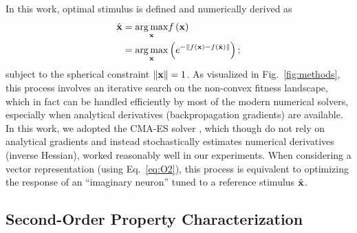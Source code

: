 \documentclass[10pt,twocolumn,letterpaper]{article}
\begin{document}
In this work, optimal stimulus is defined and numerically derived as 
\begin{align}
\hat{\bf{x}} &= \underset{\bf{x}} {\arg\max} f\left(\bf{x}\right) \label{eq:O1} \\
&= \underset{\bf{x}}{\arg\max} \left( e^{-\left\|f\left(\bf{x}\right)-f\left(\tilde{\bf{x}}\right)\right\|} \right); \label{eq:O2}
\end{align}
subject to the spherical constraint $\left\| \bf{x} \right\| = 1$. 
As visualized in Fig.~\ref{fig:methods}, this process involves an iterative search on the non-convex fitness landscape, which in fact can be handled efficiently by most of the modern numerical solvers, especially when analytical derivatives (\ie backpropagation gradients) are available.
In this work, we adopted the CMA-ES solver \cite{hansen2001completely}, which though do not rely on analytical gradients and instead stochastically estimates numerical derivatives (\ie inverse Hessian), {worked} reasonably well in our experiments.
When considering a vector representation (using Eq.~\ref{eq:O2}), this process is equivalent to optimizing the response of an ``imaginary neuron'' tuned to a reference stimulus $\tilde{\bf{x}}$.


\subsection{Second-Order Property Characterization}

\newcommand{\expdiff}{The way the simple linear constraint is constructed to enforce the exploration of a larger extent of the fitness landscape is also one of the main differences compared to \cite{erhan2010understanding}.}
\end{document}
